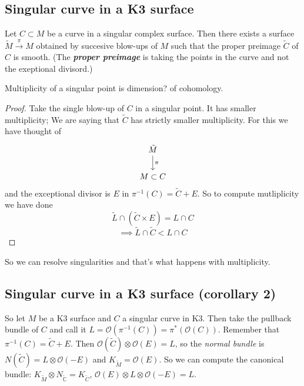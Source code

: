 \subsection{Singular curve in a K3 surface}

\begin{claim}\leavevmode
	Let $C\subset M$ be a curve in a singular complex surface. Then there exists a surface $\tilde{M}\xrightarrow{\pi}M$ obtained by succesive blow-ups of $M$ such that the proper preimage $\tilde{C}$ of $C$ is smooth. (The \textit{\textbf{proper preimage}} is taking the points in the curve and not the exeptional divisord.)
\end{claim}

\begin{defn}\leavevmode
	Multiplicity of a singular point is dimension? of cohomology. \end{defn}

\begin{proof}\leavevmode
	Take the single blow-up of $C$ in a singular point. It has smaller multiplicity; We are saying that $\tilde{C}$ has strictly smaller multiplicity. For this we have thought of
	\[\begin{tikzcd}
	\tilde{M}\arrow[d,"\pi"]\\
	M\subset C
	\end{tikzcd}\]
	and the exceptional divisor is $E$ in $\pi^{-1}(C)=\tilde{C}+E$. So to compute mutliplicity we have done
	\[\tilde{L}\cap(\tilde{C} \times E)=L\cap C\]
	\[\implies \tilde{L}\cap \tilde{C}<L\cap C\]
\end{proof}

\begin{remark}\leavevmode
	So we can resolve singularities and that's what happens with multiplicity.
\end{remark}

\subsection{Singular curve in a K3 surface (corollary 2)}

So let $M$ be a K3 surface and $C$ a singular curve in K3. Then take the pullback bundle of $C$ and call it $L=\mathcal{O}(\pi^{-1}(C))=\pi^*(\mathcal{O}(C))$. Remember that $\pi^{-1}(C)=\tilde{C}+E$. Then $\mathcal{O}(\tilde{C})\otimes\mathcal{O}(E)=L$, so the \textit{normal bundle} is $N(\tilde{C})=L\otimes \mathcal{O}(-E)$ and $K_{\tilde{M}}=\mathcal{O}(E)$. So we can compute the canonical bundle: $K_{\tilde{M}}\otimes N_{\tilde{\mathbb{C}}}=K_{\tilde{C}}$, $\mathcal{O}(E)\otimes L\otimes \mathcal{O}(-E)=L$.


